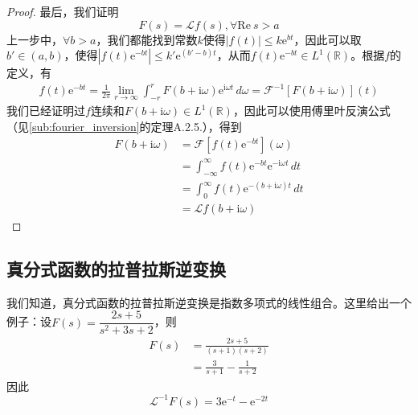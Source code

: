 \begin{proof}
    最后，我们证明
    $$F(s)=\mathcal{L} f(s),\forall \text{Re}\ s>a$$
    上一步中，$\forall b>a$，我们都能找到常数$k$使得$|f(t)|\leq k \mathrm{e}^{b t}$，因此可以取$b'\in(a,b)$，使得$|f(t)\mathrm{e}^{-bt}|\leq k'\mathrm{e}^{(b'-b)t}$，从而$f(t)\mathrm{e}^{-bt}\in L^1(\mathbb{R})$。根据$f$的定义，有
    \begin{align*}
        f(t)\mathrm{e}^{-b t}=\frac{1}{2\pi}\lim_{r\to\infty}\int_{-r}^{r}F(b+\mathrm{i}\omega)\mathrm{e}^{\mathrm{i}\omega t}\,d\omega
        =\mathcal{F}^{-1} [F(b+\mathrm{i}\omega)](t)
    \end{align*}
    我们已经证明过$f$连续和$F(b+\mathrm{i}\omega)\in L^1(\mathbb{R})$，因此可以使用傅里叶反演公式（见\ref{sub:fourier_inversion}的定理A.2.5.），得到
    \begin{align*}
        F(b+\mathrm{i}\omega)&=\mathcal{F} [f(t)\mathrm{e}^{-b t}](\omega)\\
        &=\int_{-\infty}^{\infty}f(t)\mathrm{e}^{-b t}\mathrm{e}^{-\mathrm{i}\omega t}\,dt\\
        &=\int_{0}^{\infty}f(t)\mathrm{e}^{-(b+\mathrm{i}\omega) t}\,dt\\
        &=\mathcal{L} f(b+\mathrm{i}\omega)
    \end{align*}
\end{proof}

\subsection{真分式函数的拉普拉斯逆变换}\label{sub:frac_laplace_inverse}
\begin{example}[真分式函数]
    我们知道，真分式函数的拉普拉斯逆变换是指数多项式的线性组合。这里给出一个例子：设$F(s)=\dfrac{2s+5}{s^2+3s+2}$，则
    \begin{align*}
        F(s)&=\frac{2s+5}{(s+1)(s+2)}\\
        &=\frac{3}{s+1}-\frac{1}{s+2}
    \end{align*}
    因此
    \[\mathcal{L}^{-1} F(s)=3\mathrm{e}^{-t}-\mathrm{e}^{-2t}\]
\end{example}

